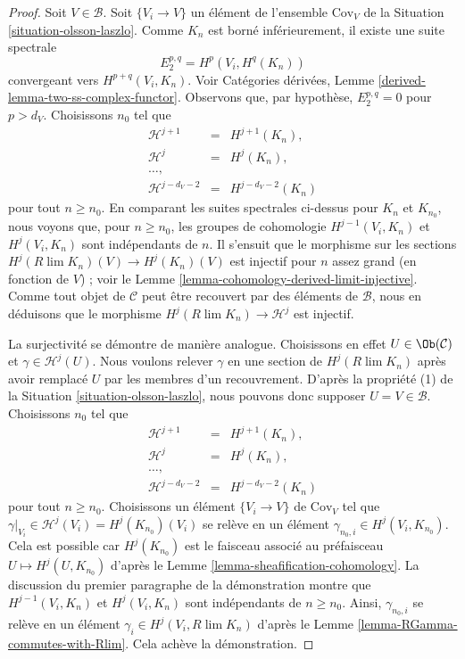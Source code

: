 \begin{proof}
Soit $V \in \mathcal{B}$. Soit $\{V_i \to V\}$ un élément de l'ensemble
$\text{Cov}_V$ de la Situation \ref{situation-olsson-laszlo}. Comme $K_n$
est borné inférieurement, il existe une suite spectrale
$$
E_2^{p, q} = H^p(V_i, H^q(K_n))
$$
convergeant vers $H^{p + q}(V_i, K_n)$. Voir Catégories dérivées, Lemme
\ref{derived-lemma-two-ss-complex-functor}. Observons que, par hypothèse,
$E_2^{p, q} = 0$ pour $p > d_V$. Choisissons $n_0$ tel que
$$
\begin{matrix}
\mathcal{H}^{j + 1} & = & H^{j + 1}(K_n), \\
\mathcal{H}^j & = & H^j(K_n), \\
\ldots, \\
\mathcal{H}^{j - d_V - 2} & = & H^{j - d_V - 2}(K_n)
\end{matrix}
$$
pour tout $n \geq n_0$. En comparant les suites spectrales ci-dessus pour
$K_n$ et $K_{n_0}$, nous voyons que, pour $n \geq n_0$, les groupes de
cohomologie $H^{j - 1}(V_i, K_n)$ et $H^j(V_i, K_n)$ sont indépendants de
$n$. Il s'ensuit que le morphisme sur les sections
$H^j(R\lim K_n)(V) \to H^j(K_n)(V)$ est injectif pour $n$ assez grand
(en fonction de $V$) ; voir le Lemme
\ref{lemma-cohomology-derived-limit-injective}. Comme tout objet de
$\mathcal{C}$ peut être recouvert par des éléments de $\mathcal{B}$, nous
en déduisons que le morphisme
$H^j(R\lim K_n) \to \mathcal{H}^j$ est injectif.

\medskip\noindent
La surjectivité se démontre de manière analogue. Choisissons en effet
$U \in \Ob(\mathcal{C})$ et $\gamma \in \mathcal{H}^j(U)$. Nous voulons
relever $\gamma$ en une section de $H^j(R\lim K_n)$ après avoir remplacé
$U$ par les membres d'un recouvrement. D'après la propriété (1) de la
Situation \ref{situation-olsson-laszlo}, nous pouvons donc supposer
$U = V \in \mathcal{B}$. Choisissons $n_0$ tel que
$$
\begin{matrix}
\mathcal{H}^{j + 1} & = & H^{j + 1}(K_n), \\
\mathcal{H}^j & = & H^j(K_n), \\
\ldots, \\
\mathcal{H}^{j - d_V - 2} & = & H^{j - d_V - 2}(K_n)
\end{matrix}
$$
pour tout $n \geq n_0$. Choisissons un élément $\{V_i \to V\}$ de
$\text{Cov}_V$ tel que
$\gamma|_{V_i} \in \mathcal{H}^j(V_i) = H^j(K_{n_0})(V_i)$
se relève en un élément $\gamma_{n_0, i} \in H^j(V_i, K_{n_0})$. Cela est
possible car $H^j(K_{n_0})$ est le faisceau associé au préfaisceau
$U \mapsto H^j(U, K_{n_0})$ d'après le Lemme
\ref{lemma-sheafification-cohomology}. La discussion du premier paragraphe
de la démonstration montre que $H^{j - 1}(V_i, K_n)$ et
$H^j(V_i, K_n)$ sont indépendants de $n \geq n_0$. Ainsi,
$\gamma_{n_0, i}$ se relève en un élément
$\gamma_i \in H^j(V_i, R\lim K_n)$ d'après le Lemme
\ref{lemma-RGamma-commutes-with-Rlim}. Cela achève la démonstration.
\end{proof}

